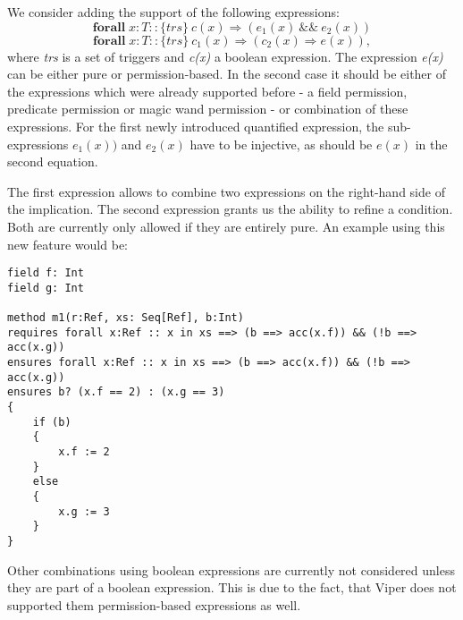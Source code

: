 \documentclass[12pt]{article}
\begin{document}
We consider adding the support of the following expressions:
\begin{equation}
\label{eq1}
	\mathbf{forall} \; x:T :: \{trs\}\  c(x) \Rightarrow (e_1(x)\ \&\& \ e_2(x))
\end{equation}
\begin{equation}
\label{eq2}
	\mathbf{forall} \; x:T ::  \{trs\}\ c_1(x) \Rightarrow (c_2(x) \Rightarrow e(x)),
\end{equation}
where {\it trs} is a set of triggers and {\it c(x)} a boolean expression. The expression {\it e(x)} can be either pure or permission-based. In the second case it should be either of the expressions which were already supported before - a field permission, predicate permission or magic wand permission - or combination of these expressions. For the first newly introduced quantified expression, the sub-expressions \(e_1(x))\) and \(e_2(x)\) have to be injective, as should be \( e(x)\) in the second equation.

The first expression allows to combine two expressions on the right-hand side of the implication. The second expression  grants us the ability to refine a condition. Both are currently only allowed if they are entirely pure. An example using this new feature would be: 

\begin{lstlisting}
field f: Int
field g: Int

method m1(r:Ref, xs: Seq[Ref], b:Int)
requires forall x:Ref :: x in xs ==> (b ==> acc(x.f)) && (!b ==> acc(x.g))
ensures forall x:Ref :: x in xs ==> (b ==> acc(x.f)) && (!b ==> acc(x.g))
ensures b? (x.f == 2) : (x.g == 3)
{
    if (b)
    {
        x.f := 2
    }
    else
    {
        x.g := 3
    }
}
\end{lstlisting}

Other combinations using boolean expressions are currently not considered unless they are part of a boolean expression. This is due to the fact, that Viper does not supported them permission-based expressions as well.
\end{document}
